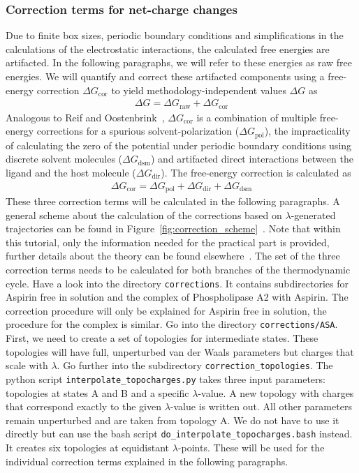 \subsubsection{Correction terms for net-charge changes}
Due to finite box sizes, periodic boundary conditions and
simplifications in the calculations of the electrostatic interactions,
the calculated free energies are artifacted. In the following
paragraphs, we will refer to these energies as raw free energies. We
will quantify and correct these artifacted components using a
free-energy correction $\Delta G_{\text{cor}}$ to yield methodology-independent
values $\Delta G$ as
\begin{align}
    \Delta G = \Delta G_{\text{raw}} + \Delta G_{\text{cor}}
\end{align}
%
Analogous to Reif and Oostenbrink~\cite{Reif2014}, $\Delta G_{\text{cor}}$ is a
combination of multiple free-energy corrections for a spurious
solvent-polarization ($\Delta G_{\text{pol}}$), the impracticality
of
calculating the zero of the potential under periodic boundary
conditions using discrete solvent molecules ($\Delta G_{\text{dsm}}$) and
artifacted direct interactions between the ligand and the host
molecule ($\Delta G_{\text{dir}}$). The free-energy correction is calculated
as
\begin{align} \label{equ:corrected_free_energy}
  \Delta G_{\text{cor}} = \Delta G_{\text{pol}} + \Delta G_{\text{dir}} + \Delta G_{\text{dsm}}
\end{align}
%
These three correction terms will be calculated in the following
paragraphs. A general scheme about the calculation of the corrections
based on $\lambda$-generated trajectories can be found in
Figure~\ref{fig:correction_scheme}~\cite{Ohlknecht2020}. 
Note that within this tutorial, only the information needed for the
practical part is provided, further details about the theory can be
found elsewhere~\cite{ReifBook2011,Kastenholz2006_I,Reif2014}. The set
of the three correction terms needs to be calculated for both branches of
the thermodynamic cycle. Have a look into the directory
\texttt{corrections}. It contains subdirectories for Aspirin free in
solution and the complex of Phospholipase A2 with Aspirin. The
correction procedure will only be explained for Aspirin free in
solution, the procedure for the complex is similar. Go into the
directory \texttt{corrections/ASA}. First, we need to create a set of
topologies for intermediate states. These topologies will have full,
unperturbed van der Waals parameters but charges that scale with $\lambda$.  Go
further into the subdirectory \texttt{correction\_topologies}. The
python script \texttt{interpolate\_topocharges.py} takes three input
parameters: topologies at states A and B and a specific
$\lambda$-value. A new topology with charges that correspond exactly
to the given $\lambda$-value is written out. All other parameters
remain unperturbed and are taken from topology A. We do not have to use
it directly but can use the bash script
\texttt{do\_interpolate\_topocharges.bash} instead. It creates six
topologies at equidistant $\lambda$-points. These will be used for the
individual correction terms explained in the following paragraphs.

